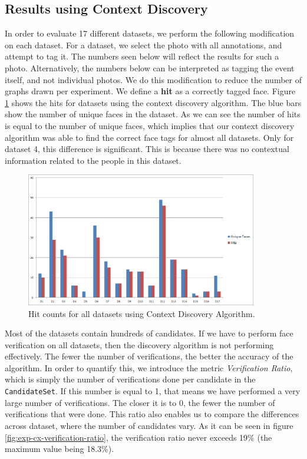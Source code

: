 \subsection{Results using Context Discovery}
In order to evaluate 17 different datasets, we perform the following modification on each dataset. For a dataset, we select the photo with all annotations, and attempt to tag it. The numbers seen below will reflect the results for such a photo. Alternatively, the numbers below can be interpreted as tagging the event itself, and not individual photos. We do this modification to reduce the number of graphs drawn per experiment. We define a \textbf{hit} as a correctly tagged face. Figure \ref{fig:exp-cx-hits} shows the hits for datasets using the context discovery algorithm. The blue bars show the number of unique faces in the dataset. As we can see the number of hits is equal to the number of unique faces, which implies that our context discovery algorithm was able to find the correct face tags for almost all datasets. Only for dataset 4, this difference is significant. This is because there was no contextual information related to the people in this dataset.

\begin{figure}[t]
\centering
\includegraphics[width=0.9\textwidth]{media/chapter5/cx-unique-faces-hits-all-datasets.png}
\caption{Hit counts for all datasets using Context Discovery Algorithm.}
\label{fig:exp-cx-hits}
\end{figure}

Most of the datasets contain hundreds of candidates. If we have to perform face verification on all datasets, then the discovery algorithm is not performing effectively. The fewer the number of verifications, the better the accuracy of the algorithm. In order to quantify this, we introduce the metric \textit{Verification Ratio}, which is simply the number of verifications done per candidate in the \texttt{CandidateSet}. If this number is equal to 1, that means we have performed a very large number of verifications. The closer it is to 0, the fewer the number of verifications that were done. This ratio also enables us to compare the differences across dataset, where the number of candidates vary. As it can be seen in figure \ref{fig:exp-cx-verification-ratio}, the verification ratio never exceeds 19\% (the maximum value being 18.3\%).

